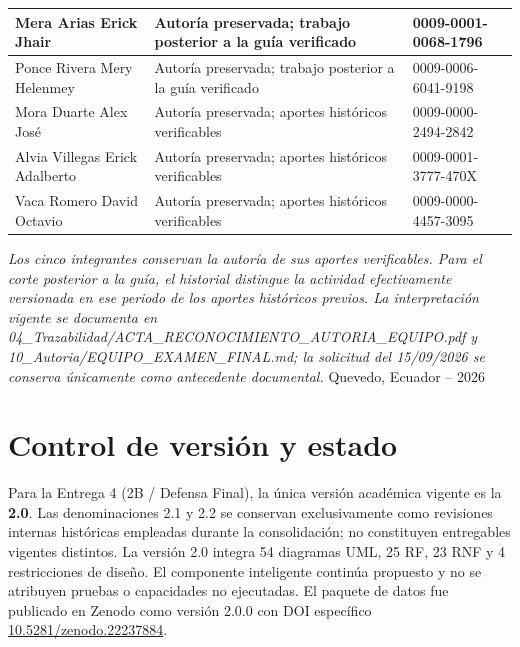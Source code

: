 \documentclass[11pt,a4paper,twoside]{article}
\newcommand{\zenododoi}{\href{https://doi.org/10.5281/zenodo.22237884}{10.5281/zenodo.22237884}}
\begin{document}
\begin{titlepage}
\begin{tabularx}{\textwidth}{|X|X|p{4.15cm}|}
Mera Arias Erick Jhair & Autoría preservada; trabajo posterior a la guía verificado & 0009-0001-0068-1796\\\hline
Ponce Rivera Mery Helenmey & Autoría preservada; trabajo posterior a la guía verificado & 0009-0006-6041-9198\\\hline
Mora Duarte Alex José & Autoría preservada; aportes históricos verificables & 0009-0000-2494-2842\\\hline
Alvia Villegas Erick Adalberto & Autoría preservada; aportes históricos verificables & 0009-0001-3777-470X\\\hline
Vaca Romero David Octavio & Autoría preservada; aportes históricos verificables & 0009-0000-4457-3095\\\hline
\end{tabularx}
\vspace{0.12cm}
\footnotesize \textit{Los cinco integrantes conservan la autoría de sus aportes verificables. Para el corte posterior a la guía, el historial distingue la actividad efectivamente versionada en ese periodo de los aportes históricos previos. La interpretación vigente se documenta en 04\_Trazabilidad/ACTA\_RECONOCIMIENTO\_AUTORIA\_EQUIPO.pdf y 10\_Autoria/EQUIPO\_EXAMEN\_FINAL.md; la solicitud del 15/09/2026 se conserva únicamente como antecedente documental.}
\vfill
\normalsize Quevedo, Ecuador -- 2026
\end{titlepage}
\tableofcontents
\listoffigures
\listoftables
\newpage

\section{Control de versión y estado}
Para la Entrega 4 (2B / Defensa Final), la única versión académica vigente es la \textbf{2.0}. Las denominaciones 2.1 y 2.2 se conservan exclusivamente como revisiones internas históricas empleadas durante la consolidación; no constituyen entregables vigentes distintos. La versión 2.0 integra 54 diagramas UML, 25 RF, 23 RNF y 4 restricciones de diseño. El componente inteligente continúa propuesto y no se atribuyen pruebas o capacidades no ejecutadas. El paquete de datos fue publicado en Zenodo como versión 2.0.0 con DOI específico \zenododoi.
\end{document}

